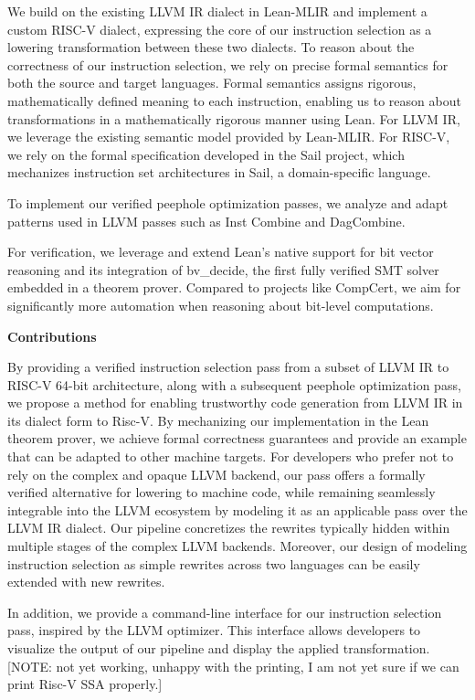 We build on the existing LLVM IR dialect in Lean-MLIR and implement a custom RISC-V dialect, expressing the core of our instruction selection as a lowering transformation between these two dialects. To reason about the correctness of our instruction selection, we rely on precise formal semantics for both the source and target languages. Formal semantics assigns rigorous, mathematically defined meaning to each instruction, enabling us to reason about transformations in a mathematically rigorous manner using Lean. For LLVM IR, we leverage the existing semantic model provided by Lean-MLIR. For RISC-V, we rely on the formal specification developed in the Sail project, which mechanizes instruction set architectures in Sail, a domain-specific language. 

To implement our verified peephole optimization passes, we analyze and adapt patterns used in LLVM passes such as Inst Combine and DagCombine.

For verification, we leverage and extend Lean’s native support for bit vector reasoning and its integration of bv\_decide, the first fully verified SMT solver embedded in a theorem prover. Compared to projects like CompCert, we aim for significantly more automation when reasoning about bit-level computations. 

\textbf{Contributions }

By providing a verified instruction selection pass from a subset of LLVM IR to RISC-V 64-bit architecture, along with a subsequent peephole optimization pass, we propose a method for enabling trustworthy code generation from LLVM IR in its dialect form to Risc-V. By mechanizing our implementation in the Lean theorem prover, we achieve formal correctness guarantees and provide an example that can be adapted to other machine targets. For developers who prefer not to rely on the complex and opaque LLVM backend, our pass offers a formally verified alternative for lowering to machine code, while remaining seamlessly integrable into the LLVM ecosystem by modeling it as an applicable pass over the LLVM IR dialect. Our pipeline concretizes the rewrites typically hidden within multiple stages of the complex LLVM backends. Moreover, our design of modeling instruction selection as simple rewrites across two languages can be easily extended with new rewrites.

In addition, we provide a command-line interface for our instruction selection pass, inspired by the LLVM optimizer. This interface allows developers to visualize the output of our pipeline and display the applied transformation.
[NOTE: not yet working, unhappy with the printing, I am not yet sure if we can print Risc-V SSA properly.]

